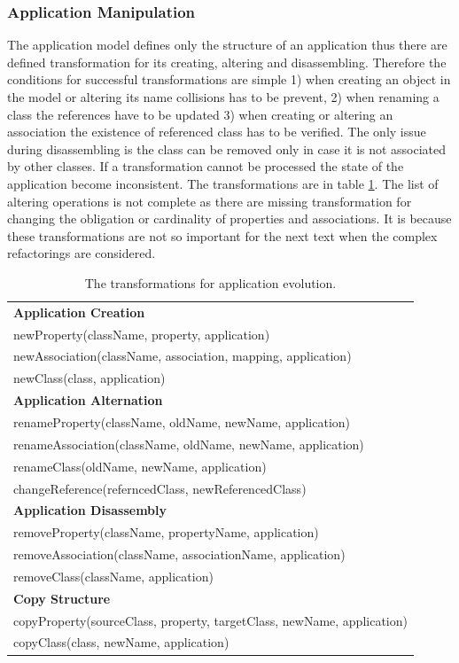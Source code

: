 \documentclass[11pt]{article}
\begin{document}
\subsubsection{Application Manipulation}
\label{sec:app-evolution}
The application model defines only the structure of an application thus there are defined transformation for its creating, altering and disassembling. Therefore the conditions for successful transformations are simple 1) when creating an object in the model or altering its name collisions has to be prevent, 2) when renaming a class the references have to be updated 3) when creating or altering an association the existence of referenced class has to be verified. The only issue during disassembling is the class can be removed only in case it is not associated by other classes. If a transformation cannot be processed the state of the application become inconsistent. The transformations are in table \ref{tab:app-evolution}. The list of altering operations is not complete as there are missing transformation for changing the obligation or cardinality of properties and associations. It is because these transformations are not so important for the next text when the complex refactorings are considered. 
\begin{table}
\centering
	\begin{tabular}{|l|}
	\hline
	\textbf{Application Creation} \\
	newProperty(className, property, application) \\
	newAssociation(className, association, mapping, application) \\
	newClass(class, application) \\
	\textbf{Application Alternation} \\
	renameProperty(className, oldName, newName, application) \\
	renameAssociation(className, oldName, newName, application) \\
	renameClass(oldName, newName, application)\\
	changeReference(referncedClass, newReferencedClass) \\
	\textbf{Application Disassembly} \\
	removeProperty(className, propertyName, application) \\
	removeAssociation(className, associationName, application) \\
	removeClass(className, application)\\
	\textbf{Copy Structure}\\
	copyProperty(sourceClass, property, targetClass, newName, application)  \\
	copyClass(class, newName, application) \\
	\hline
	\end{tabular}
	\caption{The transformations for application evolution.}
	\label{tab:app-evolution}
\end{table}
\end{document}
